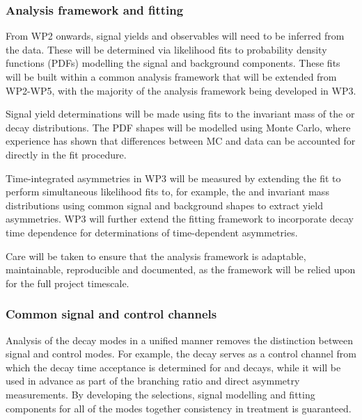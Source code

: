 \documentclass[11pt,a4paper]{article}
\begin{document}
\subsubsection{Analysis framework and fitting}
\label{sec:fits}
From WP2 onwards, signal yields and \CP observables will need to be inferred from the data. These will be determined via likelihood fits to probability density functions (PDFs) modelling the signal and background components. These fits will be built within a common analysis framework that will be extended from WP2-WP5, with the majority of the analysis framework being developed in WP3. 

Signal yield determinations will be made using fits to the invariant mass of the \HepProcess{\PD\PD} or  decay distributions. The PDF shapes will be modelled using Monte Carlo, where experience has shown that differences between MC and data can be accounted for directly in the fit procedure.

Time-integrated \CP asymmetries in WP3 will be measured by extending the fit to perform simultaneous likelihood fits to, for example, the \HepProcess{\PDzero\PDminus} and \HepProcess{\APDzero\PDplus} invariant mass distributions using common signal and background shapes to extract yield asymmetries. WP3 will further extend the fitting framework to incorporate decay time dependence for determinations of time-dependent \CP asymmetries. 

Care will be taken to ensure that the analysis framework is adaptable, maintainable, reproducible and documented, as the framework will be relied upon for the full project timescale. 

\subsubsection{Common signal and control channels}
\label{sec:controls}
Analysis of the decay modes in a unified manner removes the distinction between signal and control modes. For example, the decay \HepProcess{\APBzero\to\PDsminus\PDplus} serves as a control channel from which the decay time acceptance is determined for \HepProcess{\PBs\to\PDsplus\PDsminus} and \HepProcess{\PBzero\to\PDplus\PDminus} decays, while it will be used in advance as part of the branching ratio and direct \CP asymmetry measurements. By developing the selections, signal modelling and fitting components for all of the modes together consistency in treatment is guaranteed. 
\end{document}
